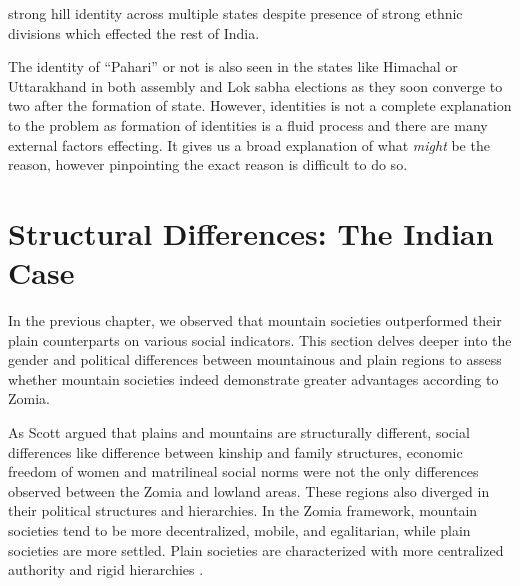 \begin{sloppypar}
strong hill identity across multiple states despite presence of strong ethnic divisions which effected the rest of India. 
    
\end{sloppypar}

The identity of ``Pahari'' or not is also seen in the states like Himachal or Uttarakhand in both assembly and Lok sabha elections as they soon converge to two after the formation of state. However, identities is not a complete explanation to the problem as formation of identities is a fluid process and there are many external factors effecting. It gives us a broad explanation of what \textit{might} be the reason, however pinpointing the exact reason is difficult to do so.
 



\section{Structural Differences: The Indian Case}
\begin{sloppypar}
    
 In the previous chapter, we observed that mountain societies outperformed their plain counterparts on various social indicators. This section delves deeper into the gender and political differences between mountainous and plain regions to assess whether mountain societies indeed demonstrate greater advantages according to Zomia. 
\end{sloppypar}
As Scott argued that plains and mountains are structurally different, social differences like difference between kinship and family structures, economic freedom of women and matrilineal social norms were not the only differences observed between the Zomia and lowland areas. These regions also diverged in their political structures and hierarchies. In the Zomia framework, mountain societies tend to be more decentralized, mobile, and egalitarian, while plain societies are more settled. Plain societies are characterized with more centralized authority and rigid hierarchies \citep{Hammond_2011}.



